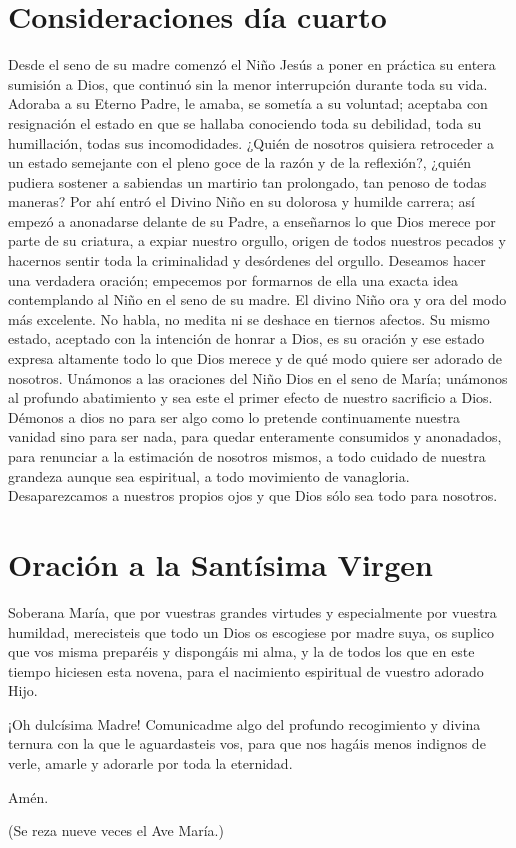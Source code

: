 \documentclass[spanish,utf8,12pt]{chlart}
\newenvironment{lectura}{\begingroup\color{lector}}{\endgroup\par}
\newenvironment{finalnotes}{\begingroup
	\footnotesize\sffamily\color{Gray}%
	\setlength{\leftskip}{3em}\setlength{\rightskip}{3em}\noindent
	}{\par\endgroup}
\begin{document}
\section{Consideraciones día cuarto}
\begin{lectura}
Desde el seno de su madre comenzó el Niño Jesús a poner en práctica su
entera sumisión a Dios, que continuó sin la menor interrupción durante
toda su vida.
Adoraba a su Eterno Padre, le amaba, se sometía a su voluntad; aceptaba
con resignación el estado en que se hallaba conociendo toda su
debilidad, toda su humillación, todas sus incomodidades.
¿Quién de nosotros quisiera retroceder a un estado semejante con el
pleno goce de la razón y de la reflexión?, ¿quién pudiera sostener a
sabiendas un martirio tan prolongado, tan penoso de todas maneras?
Por ahí entró el Divino Niño en su dolorosa y humilde carrera; así
empezó a anonadarse delante de su Padre, a enseñarnos lo que Dios merece
por parte de su criatura, a expiar nuestro orgullo, origen de todos
nuestros pecados y hacernos sentir toda la criminalidad y desórdenes del
orgullo.
Deseamos hacer una verdadera oración; empecemos por formarnos de ella
una exacta idea contemplando al Niño en el seno de su madre.
El divino Niño ora y ora del modo más excelente.
No habla, no medita ni se deshace en tiernos afectos.
Su mismo estado, aceptado con la intención de honrar a Dios, es su
oración y ese estado expresa altamente todo lo que Dios merece y de qué
modo quiere ser adorado de nosotros.
Unámonos a las oraciones del Niño Dios en el seno de María; unámonos al
profundo abatimiento y sea este el primer efecto de nuestro sacrificio a
Dios.
Démonos a dios no para ser algo como lo pretende continuamente nuestra
vanidad sino para ser nada, para quedar enteramente consumidos y
anonadados, para renunciar a la estimación de nosotros mismos, a todo
cuidado de nuestra grandeza aunque sea espiritual, a todo movimiento de
vanagloria.
Desaparezcamos a nuestros propios ojos y que Dios sólo sea todo para
nosotros.
\end{lectura}

\section{Oración a la Santísima Virgen}
\begin{lectura}
Soberana María, que por vuestras grandes virtudes y especialmente por
vuestra humildad, merecisteis que todo un Dios os escogiese por madre
suya, os suplico que vos misma preparéis y dispongáis mi alma, y la de
todos los que en este tiempo hiciesen esta novena, para el nacimiento
espiritual de vuestro adorado Hijo.

¡Oh dulcísima Madre!
Comunicadme algo del profundo recogimiento y divina ternura con la que
le aguardasteis vos, para que nos hagáis menos indignos de verle, amarle
y adorarle por toda la eternidad.

Amén.
\end{lectura}
\begin{finalnotes}
(Se reza nueve veces el Ave María.)
\end{finalnotes}
\end{document}
